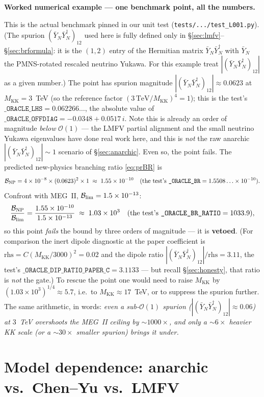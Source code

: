 \documentclass[11pt]{article}
\newenvironment{callout}[1]{%
  \par\medskip\begin{shaded}\noindent\textbf{#1}\par\smallskip}{\end{shaded}\medskip}
\newcommand{\MKK}{M_{\mathrm{KK}}}
\newcommand{\YNb}{\bar Y_N}
\newcommand{\spur}{(\YNb\YNb^\dagger)_{12}}
\newcommand{\BR}{\mathcal{B}}
\newcommand{\code}[1]{\texttt{#1}}
\theoremstyle{definition}
\begin{document}
\begin{callout}{Worked numerical example --- one benchmark point, all the numbers.}
This is the actual benchmark pinned in our unit test
(\code{tests/.../test\_L001.py}). (The spurion $\spur$ used here is fully defined
only in \S\ref{sec:lmfv}--\S\ref{sec:brformula}: it is the $(1,2)$ entry of the
Hermitian matrix $\YNb\YNb^\dagger$ with $\YNb$ the PMNS-rotated rescaled neutrino
Yukawa. For this example treat $|\spur|$ as a given number.) The point has spurion
magnitude $|\spur|\approx 0.0623$ at $\MKK=3$~TeV (so the reference factor
$(3\,\mathrm{TeV}/\MKK)^4=1$); this is the test's
$\code{\_ORACLE\_LHS}=0.062266\ldots$, the absolute value of
$\code{\_ORACLE\_OFFDIAG}=-0.0348+0.0517\,i$. Note this is already an
order of magnitude \emph{below} $\mathcal{O}(1)$ --- the LMFV partial
alignment and the small neutrino Yukawa eigenvalues have done real work here, and
this is \emph{not} the raw anarchic $|\spur|\sim 1$ scenario of
\S\ref{sec:anarchic}. Even so, the point fails. The predicted new-physics
branching ratio \eqref{eq:prBR} is
\[
\BR_{\rm NP} = 4\times10^{-8}\times(0.0623)^2\times 1
   \;\approx\; 1.55\times10^{-10}
   \quad(\text{the test's }\code{\_ORACLE\_BR}=1.5508\ldots\times10^{-10}).
\]
Confront with MEG~II, $\BR_{\rm lim}=1.5\times10^{-13}$:
\[
\frac{\BR_{\rm NP}}{\BR_{\rm lim}} = \frac{1.55\times10^{-10}}{1.5\times10^{-13}}
   \;\approx\; 1.03\times10^{3}
   \quad(\text{the test's }\code{\_ORACLE\_BR\_RATIO}=1033.9),
\]
so this point \emph{fails} the bound by three orders of magnitude --- it is
\textbf{vetoed}. (For comparison the inert dipole diagnostic at the paper
coefficient is $\text{rhs}=C(\MKK/3000)^2=0.02$ and the dipole ratio
$|\spur|/\text{rhs}=3.11$, the test's
$\code{\_ORACLE\_DIP\_RATIO\_PAPER\_C}=3.1133$ --- but recall \S\ref{sec:honesty},
that ratio is \emph{not} the gate.) To rescue the point one would need to raise
$\MKK$ by $(1.03\times10^3)^{1/4}\approx 5.7$, i.e.\ to $\MKK\approx 17$~TeV, or to
suppress the spurion further. The same arithmetic, in words: \emph{even a
sub-$\mathcal{O}(1)$ spurion ($|\spur|\approx 0.06$) at $3$~TeV overshoots the
MEG~II ceiling by $\sim 1000\times$, and only a $\sim 6\times$ heavier KK scale
(or a $\sim 30\times$ smaller spurion) brings it under.}
\end{callout}

\part{Model dependence: anarchic vs.\ Chen--Yu vs.\ LMFV}
\label{part:model}
\end{document}
